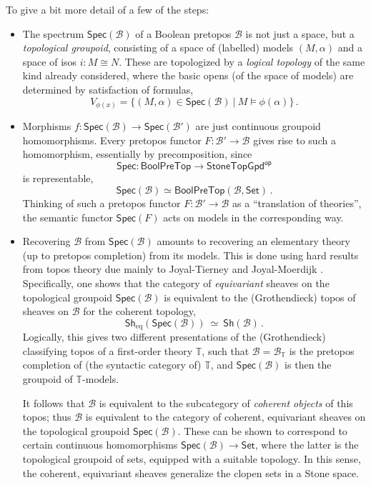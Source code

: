 \documentclass[12pt]{article}
\newcommand{\T}{\ensuremath{\mathbb{T}}}
\newcommand{\Set}{\ensuremath{\mathsf{Set}}}
\theoremstyle{remark}
\theoremstyle{definition}
\begin{document}
To give a bit more detail of a few of the steps:
\begin{itemize}
\item The spectrum $\mathsf{Spec}(\mathcal{B})$ of a Boolean pretopos $\mathcal{B}$ is not just a space, but a \emph{topological groupoid}, consisting of a space of (labelled) models $(M,\alpha)$ and a space of isos $i : M \cong N$.  These are topologized by a \emph{logical topology} of the same kind already considered, where the basic opens (of the space of models) are determined by satisfaction of formulas, $$V_{\phi(x)} = \{ (M,\alpha)\in \mathsf{Spec}(\mathcal{B})\ |\ M\models \phi(\alpha)\}\,.$$

\item Morphisms $f : \mathsf{Spec}(\mathcal{B}) \to \mathsf{Spec}(\mathcal{B'})$ are just continuous groupoid homomorphisms.  Every pretopos functor $F : \mathcal{B'} \to \mathcal{B}$ gives rise to such a homomorphism, essentially by precomposition, since 
$$\mathsf{Spec} : \mathsf{BoolPreTop} \to \mathsf{StoneTopGpd}^{\mathsf{op}}$$ 
is representable,
\[
\mathsf{Spec}(\mathcal{B}) \simeq \mathsf{BoolPreTop}(\mathcal{B}, \Set)\,.
\]
Thinking of such a pretopos functor $F :\mathcal{B'} \to \mathcal{B}$ as a ``translation of theories'', the semantic functor $\mathsf{Spec}(F)$ acts on models in the corresponding way.

\item Recovering $\mathcal{B}$ from $\mathsf{Spec}(\mathcal{B})$ amounts to recovering an elementary theory (up to pretopos completion) from its models.  This is done using hard results from topos theory due mainly to Joyal-Tierney and Joyal-Moerdijk \cite{JT,JM,BM}. Specifically, one shows that the category
of \emph{equivariant} sheaves on the topological groupoid $\mathsf{Spec}(\mathcal{B})$ is equivalent to the (Grothendieck) topos of sheaves on $\mathcal{B}$ for the coherent topology,
\[
\mathsf{Sh}_{\mathrm{eq}}(\mathsf{Spec}(\mathcal{B}))\ \simeq\ \mathsf{Sh}(\mathcal{B})\,.
\]
Logically, this gives two different presentations of the (Grothendieck) classifying topos of a first-order theory $\T$, such that $\mathcal{B} = \mathcal{B}_\T$ is the pretopos completion of (the syntactic category of) $\T$, and  $\mathsf{Spec}(\mathcal{B})$ is then the groupoid of $\T$-models.

It follows that $\mathcal{B}$ is equivalent to the subcategory of \emph{coherent objects} of this topos; thus $\mathcal{B}$ is equivalent to the category of coherent, equivariant sheaves on the topological groupoid $\mathsf{Spec}(\mathcal{B})$.  
These can be shown to correspond to certain continuous homomorphisms $\mathsf{Spec}(\mathcal{B}) \rightarrow \Set$, where the latter is the topological groupoid of sets, equipped with a suitable topology.  In this sense, the coherent, equivariant sheaves generalize the clopen sets in a Stone space.

\end{itemize}
\end{document}
